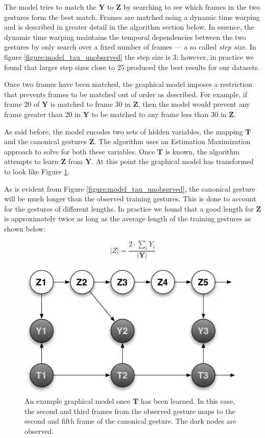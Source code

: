 \documentclass{article}
\begin{document}
The model tries to match the $\mathbf{Y}$ to $\mathbf{Z}$ by searching to see
which frames in the two gestures form the best match. Frames are matched using a
dynamic time warping and is described in greater detail in the algorithm section
below. In essence, the dynamic time warping maintains the temporal dependencies
between the two gestures by only search over a fixed number of frames --- a so
called \emph{step size}. In figure \ref{figure:model_tau_unobserved} the step
size is 3; however, in practice we found that larger step sizes close to 25
produced the best results for our datasets.

Once two frames have been matched, the graphical model imposes a restriction
that prevents frames to be matched out of order as described. For example, if
frame 20 of $\mathbf{Y}$ is matched to frame 30 in $\mathbf{Z}$, then the model
would prevent any frame greater than 20 in $\mathbf{Y}$ to be matched to any
frame less than 30 in $\mathbf{Z}$.

As said before, the model encodes two sets of hidden variables, the mapping
$\mathbf{T}$ and the canonical gestures $\mathbf{Z}$. The algorithm uses an
Estimation Maximization approach to solve for both these variables. Once
$\mathbf{T}$ is known, the algorithm attempts to learn $\mathbf{Z}$ from
$\mathbf{Y}$. At this point the graphical model has transformed to look like
Figure \ref{figure:model_tau_observed}.

As is evident from Figure \ref{figure:model_tau_unobserved}, the canonical
gesture will be much longer than the observed training gestures. This is done to
account for the gestures of different lengths. In practice we found that a good
length for $\mathbf{Z}$ is approximately twice as long as the average length of
the training gestures as shown below:

\begin{equation}
\label{lengthZ}
|Z| = \frac{2 \cdot \sum_{i}{Y_i}}{|\mathbf{Y}|}
\end{equation}

\begin{figure}
\begin{centering}
\includegraphics[width=0.63\columnwidth]{figures/model_tau_observed.pdf}

\caption{An example graphical model once $\mathbf{T}$ has been learned. In this
case, the second and third frames from the observed gesture maps to the second
and fifth frame of the canonical gesture. The dark nodes are observed.
\label{figure:model_tau_observed}}

\end{centering}
\end{figure}
\end{document}
